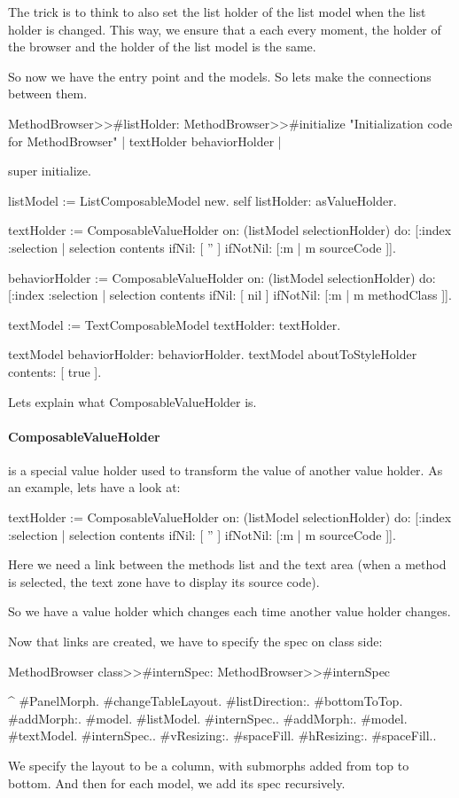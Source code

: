 \documentclass[a4paper,10pt,twoside]{book}
\begin{document}
The trick is to think to also set the list holder of the list model when the list holder is changed. This way, we ensure that a each every moment, the holder of the browser and the holder of the list model is the same.

So now we have the entry point and the models. So lets make the connections between them.

\begin{method}{MethodBrowser>>\#listHolder:}
MethodBrowser>>#initialize
	"Initialization code for MethodBrowser"
	| textHolder behaviorHolder |
	
	super initialize.

	listModel := ListComposableModel new.
	self listHolder: {} asValueHolder.
	
	textHolder := ComposableValueHolder on: (listModel selectionHolder) do: [:index :selection | selection contents 
		ifNil: [ '' ]
		ifNotNil: [:m | m sourceCode ]].
	
	behaviorHolder := ComposableValueHolder on: (listModel selectionHolder) do: [:index :selection | selection contents 
		ifNil: [ nil ]
		ifNotNil: [:m | m methodClass ]].
	
	textModel := TextComposableModel textHolder: textHolder.

	textModel behaviorHolder: behaviorHolder.
	textModel aboutToStyleHolder contents: [ true ].
\end{method}
Lets explain what ComposableValueHolder is.

\paragraph{ComposableValueHolder} is a special value holder used to transform the value of another value holder. As an example, lets have a look at: 
\begin{code}{}
textHolder := ComposableValueHolder on: (listModel selectionHolder) do: [:index :selection | selection contents 
		ifNil: [ '' ]
		ifNotNil: [:m | m sourceCode ]].
\end{code}

Here we need a link between the methods list and the text area (when a method is selected, the text zone have to display its source code).

So we have a value holder which changes each time another value holder changes.

Now that links are created, we have to specify the spec on class side:

\begin{method}{MethodBrowser class>>\#internSpec:}
MethodBrowser>>#internSpec

	^{ #PanelMorph.
			#changeTableLayout.
			#listDirection:. #bottomToTop.
			#addMorph:. {#model. #listModel. #internSpec.}.
			#addMorph:. {#model. #textModel. #internSpec.}.
			#vResizing:. #spaceFill.
			#hResizing:. #spaceFill.}.
\end{method}
We specify the layout to be a column, with submorphs added from top to bottom.
And then for each model, we add its spec recursively.
\end{document}
